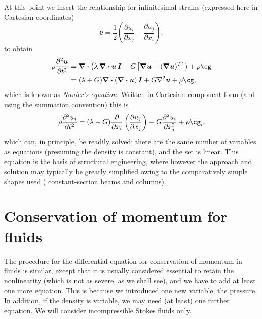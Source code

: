 \documentclass[twoside,11pt]		{report}
\begin{document}
At this point we insert the relationship for infinitesimal strains
(expressed here in Cartesian coordinates)
\[
\bm{e}=\frac{1}{2}\left(\frac{\partial u_i}{\partial x_j} + 
                        \frac{\partial u_j}{\partial x_i}\right),
\]
to obtain 
\begin{align}
\rho\frac{\partial^2 \bm{u}}{\partial t^2}
&=
\bm{\nabla\cdot}\left(\lambda\,\bm{\nabla\cdot u\,I} +
G\left[\bm{\nabla u} + (\bm{\nabla u})^T\right]\right) +
\rho\bm{\cg}\\
&=
(\lambda + G) \bm{\nabla\cdot}\left(\bm{\nabla\cdot u}\right)\bm{I} +
G\nabla^2\bm{u} +
\rho\bm{\cg},
\end{align}
which is known as \emph{Navier's equation}.  Written in Cartesian
component form (and using the summation convention) this is
\begin{equation}
\rho\frac{\partial^2 u_i}{\partial t^2}
=
(\lambda + G) \frac{\partial}{\partial x_i}\left(
\frac{\partial u_j}{\partial x_j}\right) +
G\frac{\partial^2 u_i}{\partial x_j^2} +
\rho\cg_i,
\end{equation}
which can, in principle, be readily solved; there are the same number
of variables as equations (presuming the density is constant), and the
set is linear. This equation is the basis of structural engineering,
where however the approach and solution may typically be greatly
simplified owing to the comparatively simple shapes used (\eg
constant-section beams and columns).


\section{Conservation of momentum for fluids}

The procedure for the differential equation for conservation of
momentum in fluids is similar, except that it is usually considered
essential to retain the nonlinearity (which is not as severe, as we
shall see), and we have to add at least one more equation. This is
because we introduced one new variable, the pressure. In addition, if
the density is variable, we may need (at least) one further equation.
We will consider incompressible Stokes fluids only.
\end{document}
